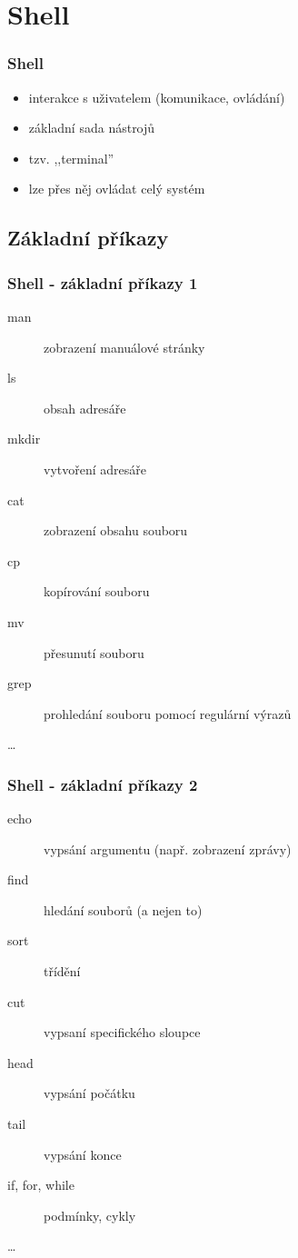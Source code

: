 \documentclass[xetex]{beamer}
\begin{document}
\section{Shell}
\begin{frame}
  \frametitle{Shell}
  \begin{itemize}
  \item interakce s uživatelem (komunikace, ovládání)
  \item základní sada nástrojů
  \item tzv. ,,terminal''
  \item lze přes něj ovládat celý systém
  \end{itemize}
\end{frame}	

\subsection{Základní příkazy}
\begin{frame}
  \frametitle{Shell - základní příkazy 1}
  \begin{description}
  \item[man] zobrazení manuálové stránky
  \item[ls] obsah adresáře
  \item[mkdir] vytvoření adresáře
  \item[cat] zobrazení obsahu souboru
  \item[cp] kopírování souboru
  \item[mv] přesunutí souboru
  \item[grep] prohledání souboru pomocí regulární výrazů 
  \item[\ldots]
  \end{description}
\end{frame}	

\begin{frame}
  \frametitle{Shell - základní příkazy 2}
  \begin{description}
  \item[echo] vypsání argumentu (např. zobrazení zprávy)
  \item[find] hledání souborů (a nejen to)
  \item[sort] třídění
  \item[cut] vypsaní specifického sloupce
  \item[head] vypsání počátku
  \item[tail] vypsání konce
  \item[if, for, while] podmínky, cykly
  \item[\ldots]
  \end{description}
\end{frame}	
\end{document}
